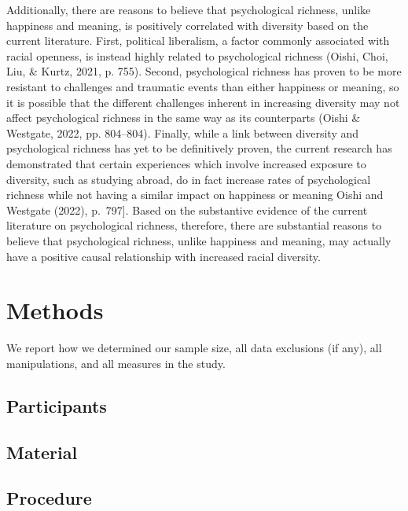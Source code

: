 \documentclass[
  man]{apa6}
\begin{document}
Additionally, there are reasons to believe that psychological richness, unlike happiness and meaning, is positively correlated with diversity based on the current literature. First, political liberalism, a factor commonly associated with racial openness, is instead highly related to psychological richness (Oishi, Choi, Liu, \& Kurtz, 2021, p. 755). Second, psychological richness has proven to be more resistant to challenges and traumatic events than either happiness or meaning, so it is possible that the different challenges inherent in increasing diversity may not affect psychological richness in the same way as its counterparts (Oishi \& Westgate, 2022, pp. 804--804). Finally, while a link between diversity and psychological richness has yet to be definitively proven, the current research has demonstrated that certain experiences which involve increased exposure to diversity, such as studying abroad, do in fact increase rates of psychological richness while not having a similar impact on happiness or meaning Oishi and Westgate (2022), p.~797{]}. Based on the substantive evidence of the current literature on psychological richness, therefore, there are substantial reasons to believe that psychological richness, unlike happiness and meaning, may actually have a positive causal relationship with increased racial diversity.

\hypertarget{methods}{%
\section{Methods}\label{methods}}

We report how we determined our sample size, all data exclusions (if any), all manipulations, and all measures in the study.

\hypertarget{participants}{%
\subsection{Participants}\label{participants}}

\hypertarget{material}{%
\subsection{Material}\label{material}}

\hypertarget{procedure}{%
\subsection{Procedure}\label{procedure}}
\end{document}

